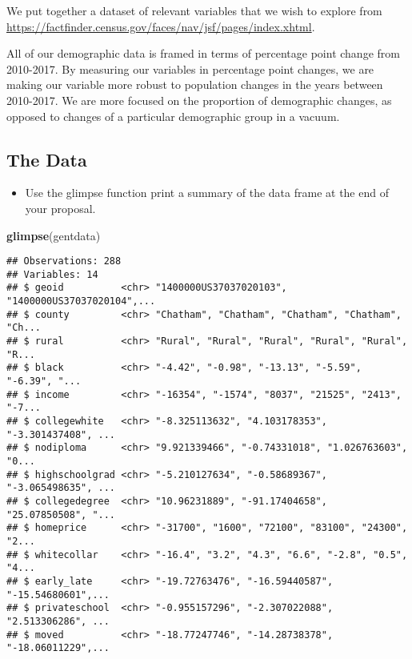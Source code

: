 \documentclass[]{article}
\newenvironment{Shaded}{\begin{snugshade}}{\end{snugshade}}
\newcommand{\KeywordTok}[1]{\textcolor[rgb]{0.13,0.29,0.53}{\textbf{#1}}}
\newcommand{\NormalTok}[1]{#1}
\providecommand{\tightlist}{%
  \setlength{\itemsep}{0pt}\setlength{\parskip}{0pt}}
\begin{document}
We put together a dataset of relevant variables that we wish to explore
from
\url{https://factfinder.census.gov/faces/nav/jsf/pages/index.xhtml}.

All of our demographic data is framed in terms of percentage point
change from 2010-2017. By measuring our variables in percentage point
changes, we are making our variable more robust to population changes in
the years between 2010-2017. We are more focused on the proportion of
demographic changes, as opposed to changes of a particular demographic
group in a vacuum.

\hypertarget{the-data}{%
\subsection{The Data}\label{the-data}}

\begin{itemize}
\tightlist
\item
  Use the glimpse function print a summary of the data frame at the end
  of your proposal.
\end{itemize}

\begin{Shaded}
\begin{Highlighting}[]
\KeywordTok{glimpse}\NormalTok{(gentdata)}
\end{Highlighting}
\end{Shaded}

\begin{verbatim}
## Observations: 288
## Variables: 14
## $ geoid          <chr> "1400000US37037020103", "1400000US37037020104",...
## $ county         <chr> "Chatham", "Chatham", "Chatham", "Chatham", "Ch...
## $ rural          <chr> "Rural", "Rural", "Rural", "Rural", "Rural", "R...
## $ black          <chr> "-4.42", "-0.98", "-13.13", "-5.59", "-6.39", "...
## $ income         <chr> "-16354", "-1574", "8037", "21525", "2413", "-7...
## $ collegewhite   <chr> "-8.325113632", "4.103178353", "-3.301437408", ...
## $ nodiploma      <chr> "9.921339466", "-0.74331018", "1.026763603", "0...
## $ highschoolgrad <chr> "-5.210127634", "-0.58689367", "-3.065498635", ...
## $ collegedegree  <chr> "10.96231889", "-91.17404658", "25.07850508", "...
## $ homeprice      <chr> "-31700", "1600", "72100", "83100", "24300", "2...
## $ whitecollar    <chr> "-16.4", "3.2", "4.3", "6.6", "-2.8", "0.5", "4...
## $ early_late     <chr> "-19.72763476", "-16.59440587", "-15.54680601",...
## $ privateschool  <chr> "-0.955157296", "-2.307022088", "2.513306286", ...
## $ moved          <chr> "-18.77247746", "-14.28738378", "-18.06011229",...
\end{verbatim}
\end{document}

